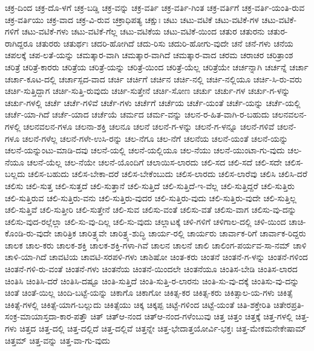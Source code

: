 {ಚಕ್ರ-ದಿಂದ
ಚಕ್ರ-ದೊ-ಳಗೆ
ಚಕ್ರ-ಬಡ್ಡಿ
ಚಕ್ರ-ವನ್ನು
ಚಕ್ರ-ವರ್ತಿ
ಚಕ್ರ-ವರ್ತಿ-ಗಿಂತ
ಚಕ್ರ-ವರ್ತಿಗೆ
ಚಕ್ರ-ವರ್ತಿ-ಯಂತಿ-ರುವ
ಚಕ್ರ-ವರ್ತಿಯು
ಚಕ್ರ-ವಾದ
ಚಕ್ರ-ವಿ-ರುವ
ಚಕ್ರಾಧಿಪತ್ಯ
ಚಕ್ಷುಃ
ಚಟು
ಚಟು-ವಟಿಕೆ
ಚಟು-ವಟಿಕೆ-ಗಳ
ಚಟು-ವಟಿಕೆ-ಗಳಿಗೆ
ಚಟು-ವಟಿಕೆ-ಗಳು
ಚಟು-ವಟಿಕೆ-ಗೆಲ್ಲ
ಚಟು-ವಟಿಕೆಯ
ಚಟು-ವಟಿಕೆ-ಯಿಂದ
ಚತುರ
ಚತುರನು
ಚತುರ-ರಾಗಿದ್ದರೂ
ಚತುರರು
ಚತುರ್ಥಃ
ಚದರಿ-ಹೋಗಿದೆ
ಚದು-ರಿಸು
ಚದುರಿ-ಹೋಗು-ವುದೇ
ಚನೆ
ಚನೆ-ಗಳು
ಚನೆಯ
ಚಪಲಕ್ಕೆ
ಚಪ-ಲತೆ-ಯನ್ನು
ಚಮತ್ಕಾರ-ವಾಗಿ
ಚಮತ್ಕಾರ-ವಾಗಿದೆ
ಚಮತ್ಕಾರ-ವಾದ
ಚರಮ
ಚರಾಚರ
ಚರಿತ್ರಾಂಶ
ಚರಿತ್ರೆ
ಚರಿತ್ರೆ-ಕಾರರು
ಚರಿತ್ರೆಯ
ಚರಿತ್ರೆ-ಯನ್ನು
ಚರಿತ್ರೆ-ಯಿಂದ
ಚರಿತ್ರೆ-ಯೆಲ್ಲ
ಚರಿತ್ರೆಯೇ
ಚರ್ಚನ್ನಾಗಿ
ಚರ್ಚನ್ನೆ
ಚರ್ಚಾ
ಚರ್ಚಾ-ಕೂಟ-ದಲ್ಲಿ
ಚರ್ಚಾಸ್ಪದ-ವಾದ
ಚರ್ಚಿ
ಚರ್ಚಿಗೆ
ಚರ್ಚಿನ
ಚರ್ಚಿ-ನಲ್ಲಿ
ಚರ್ಚಿ-ನಲ್ಲಿಯೂ
ಚರ್ಚಿ-ಸಿ-ರು-ವರು
ಚರ್ಚಿ-ಸುತ್ತಿದ್ದಾಗ
ಚರ್ಚಿ-ಸುತ್ತಿ-ರುವುದು
ಚರ್ಚಿ-ಸುತ್ತೇನೆ
ಚರ್ಚಿ-ಸೋಣ
ಚರ್ಚು
ಚರ್ಚು-ಗಳ
ಚರ್ಚು-ಗ-ಳನ್ನು
ಚರ್ಚು-ಗಳಲ್ಲಿ
ಚರ್ಚೆ
ಚರ್ಚೆ-ಗಳಿವೆ
ಚರ್ಚೆ-ಗಳು
ಚರ್ಚೆಗೆ
ಚರ್ಚೆಯ
ಚರ್ಚೆ-ಯಂತೆ
ಚರ್ಚೆ-ಯನ್ನು
ಚರ್ಚೆ-ಯಲ್ಲಿ
ಚರ್ಚೆ-ಯಾ-ಗಿದೆ
ಚರ್ಚೆ-ಯಾದ
ಚರ್ಚೆಯೆ
ಚರ್ಮದ
ಚರ್ಮ-ವನ್ನು
ಚಲನ-ರ-ಹಿತ-ವಾಗಿ-ರ-ಬಹುದು
ಚಲನವಲನ-ಗಳಲ್ಲಿ
ಚಲನವಲನ-ಗಳೂ
ಚಲನಾ-ಶಕ್ತಿ
ಚಲನೂ
ಚಲನೆ
ಚಲನೆ-ಗ-ಳನ್ನು
ಚಲನೆ-ಗ-ಳನ್ನೂ
ಚಲನೆ-ಗಳಿವೆ
ಚಲನೆ-ಗಳೂ
ಚಲನೆ-ಗಳೆಲ್ಲ
ಚಲನೆ-ಗಳೇ-ಉಸಿ-ರನ್ನು
ಚಲ-ನೆಗೂ
ಚಲ-ನೆಗೆ
ಚಲನೆಯ
ಚಲನೆ-ಯಂತೆ
ಚಲನೆ-ಯನ್ನು
ಚಲನೆ-ಯನ್ನುಂಟು-ಮಾಡಿ-ದವು
ಚಲನೆ-ಯಲ್ಲಿ
ಚಲನೆ-ಯಲ್ಲಿಯೂ
ಚಲ-ನೆಯು
ಚಲನೆ-ಯುಂಟಾ-ಗು-ವುದು
ಚಲ-ನೆಯೂ
ಚಲನೆ-ಯೆಲ್ಲ
ಚಲ-ನೆಯೇ
ಚಲನೆ-ಯೊಂದಿಗೆ
ಚಲಾಯಿಸ-ಲಾರದು
ಚಲಿ-ಸದ
ಚಲಿ-ಸದೆ
ಚಲಿ-ಸದೇ
ಚಲಿಸ-ಬಲ್ಲದು
ಚಲಿಸ-ಬಹುದು
ಚಲಿಸ-ಬೇಕಾ-ದರೆ
ಚಲಿಸ-ಬೇಕೆಂಬುದು
ಚಲಿಸ-ಲಾರದು
ಚಲಿಸ-ಲಾರೆವು
ಚಲಿಸಿ
ಚಲಿಸಿ-ದರೆ
ಚಲಿಸು
ಚಲಿ-ಸುತ್ತ
ಚಲಿ-ಸುತ್ತದೆ
ಚಲಿ-ಸುತ್ತಾನೆ
ಚಲಿ-ಸುತ್ತಿದೆ
ಚಲಿ-ಸುತ್ತಿದೆ-ಇ-ವೆಲ್ಲ
ಚಲಿ-ಸುತ್ತಿದ್ದರೆ
ಚಲಿ-ಸುತ್ತಿರು
ಚಲಿ-ಸುತ್ತಿರುವ
ಚಲಿ-ಸುತ್ತಿರು-ವನು
ಚಲಿ-ಸುತ್ತಿರು-ವುದರ
ಚಲಿ-ಸುತ್ತಿರು-ವುದು
ಚಲಿ-ಸುತ್ತಿರು-ವುದೇ
ಚಲಿ-ಸುತ್ತಿಲ್ಲ
ಚಲಿ-ಸುತ್ತಿವೆ
ಚಲಿ-ಸುತ್ತೀರಿ
ಚಲಿ-ಸುತ್ತೇನೆ
ಚಲಿ-ಸುವ
ಚಲಿಸು-ವಂತೆ
ಚಲಿಸು-ವತೆ
ಚಲಿಸು-ವಾಗ
ಚಲಿಸು-ವು-ದನ್ನು
ಚಲಿಸು-ವುದ-ರಲ್ಲೆಲ್ಲಾ
ಚಲಿ-ಸು-ವು-ದಿಲ್ಲ
ಚಲಿ-ಸು-ವುದು
ಚಲ್ಲಾಟಕ್ಕೆ
ಚಳಿ-ಗಳಿಗೆ
ಚಳಿಗಾಲ-ದಲ್ಲಿ
ಚಳಿ-ಯಿಂದ
ಚಾಚಿ-ಕೊಂಡಿ-ರು-ವುದೇ
ಚಾರಿತ್ರಿಕ
ಚಾರಿತ್ರ್ಯವೇ
ಚಾರಿತ್ರ್ಯ-ಶುದ್ಧಿ
ಚಾರ್ಯ-ರಲ್ಲಿ
ಚಾರ್ಯರು
ಚಾರ್ವಾಕ-ರಿಗೆ
ಚಾರ್ವಾಕ-ರಿದ್ದರು
ಚಾಲಕ
ಚಾಲ-ಕರು
ಚಾಲಕ-ಶಕ್ತಿ
ಚಾಲಕ-ಶಕ್ತಿ-ಗಳಾ-ಗಿವೆ
ಚಾಲನ
ಚಾಲನೆ
ಚಾಲಿ
ಚಾಲಿಂಗ-ಪರ್ಯವ-ಸಾ-ನಮ್
ಚಾಳಿ
ಚಾಳಿ-ಯಾ-ಗಿದೆ
ಚಾವಟಿಯ
ಚಾವಟಿ-ಸರಪಳಿ-ಗಳು
ಚಾಶಿಷೋ
ಚಿಂತ-ಕರು
ಚಿಂತನೆ
ಚಿಂತನೆ-ಗ-ಳನ್ನು
ಚಿಂತನೆ-ಗಳಿಂದ
ಚಿಂತನೆ-ಗಳಿ-ರು-ವಂತೆ
ಚಿಂತನೆ-ಗಳು
ಚಿಂತನೆಯ
ಚಿಂತನೆ-ಯಿಂದಲೇ
ಚಿಂತನೆಯೂ
ಚಿಂತಿಸ-ಬೇಡಿ
ಚಿಂತಿಸ-ಲಾರದ
ಚಿಂತಿಸಿ
ಚಿಂತಿಸಿ-ದರೆ
ಚಿಂತಿಸಿ-ದಷ್ಟೂ
ಚಿಂತಿ-ಸುತ್ತಿದೆ
ಚಿಂತಿ-ಸುತ್ತಿ-ರ-ಲಾರನು
ಚಿಂತಿ-ಸು-ವು-ದಕ್ಕೆ
ಚಿಂತಿಸು-ವು-ದನ್ನು
ಚಿಂತೆ
ಚಿಂತೆ-ಯಿಲ್ಲ
ಚಿಂದಿ-ಬಟ್ಟೆ-ಯನ್ನು
ಚಿಕಾಗೊ
ಚಿಕಾಗೋ
ಚಿಕಿತ್ಸ-ಕರ
ಚಿಕಿತ್ಸ-ಕರು
ಚಿಕಿತ್ಸಾಲ-ಯ-ಗಳು
ಚಿಕಿತ್ಸೆ
ಚಿಕಿತ್ಸೆ-ಗಳಲ್ಲಿ
ಚಿಕಿತ್ಸೆ-ಯಾಗ-ಬಲ್ಲುದು
ಚಿಕಿತ್ಸೆಯು
ಚಿಕ್ಕ
ಚಿಕ್ಕಪ್ಪ
ಚಿಟ್ಟೆ-ಗಳಿಂದ
ಚಿಟ್ಟೆ-ಯಂತೆ
ಚಿತಿ-ಶಕ್ತೇರಿತಿ
ಚಿತೇರಪ್ರತಿ-ಸಂಕ್ರ-ಮಾಯಾಸ್ತದಾ-ಕಾರ-ಪತ್ತೌ
ಚಿತ್
ಚಿತ್ಆ-ನಂದ
ಚಿತ್ಆ-ನಂದ-ಗಳೆಂಬುವು
ಚಿತ್ತ
ಚಿತ್ತಂ
ಚಿತ್ತಕ್ಕೆ
ಚಿತ್ತ-ಗಳಲ್ಲಿ
ಚಿತ್ತ-ಗಳು
ಚಿತ್ತದ
ಚಿತ್ತ-ದಲ್ಲಿ
ಚಿತ್ತ-ದಲ್ಲಿದೆ
ಚಿತ್ತ-ದಲ್ಲಿವೆ
ಚಿತ್ತನ್ನೇ
ಚಿತ್ತ-ಭೇದಾತ್ತಯೋರ್ವಿ-ಭಕ್ತಃ
ಚಿತ್ತ-ಮೇಕಮನೇಕೇಷಾಮ್
ಚಿತ್ತಮ್
ಚಿತ್ತ-ವನ್ನು
ಚಿತ್ತ-ವಾ-ಗು-ವುದು
}
